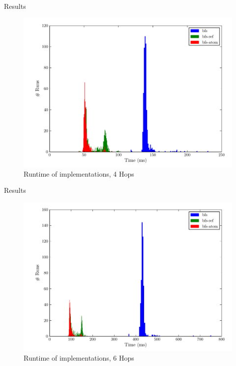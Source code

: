 \documentclass[compress]{beamer}
\begin{document}
		\begin{frame}{Results}
			\begin{figure}
				\centering
				\includegraphics[scale=0.5]{../document/figures/charts/4_hops}
				\caption{Runtime of implementations, 4 Hops}
			\end{figure}
		\end{frame}
		
		\begin{frame}{Results}
			\begin{figure}
				\centering
				\includegraphics[scale=0.5]{../document/figures/charts/6_hops}
				\caption{Runtime of implementations, 6 Hops}
			\end{figure}
		\end{frame}
	
\end{document}
